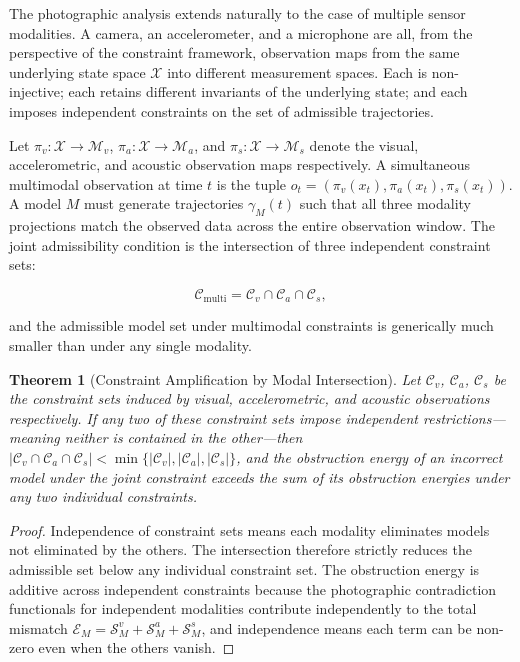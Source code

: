 \documentclass[12pt, a4paper, oneside]{article}
\theoremstyle{plain}
\newtheorem{theorem}{Theorem}[section]
\theoremstyle{definition}
\theoremstyle{remark}
\newcommand{\X}{\mathcal{X}}
\newcommand{\C}{\mathcal{C}}
\newcommand{\M}{\mathcal{M}}
\newcommand{\proj}{\pi}
\begin{document}
The photographic analysis extends naturally to the case of multiple sensor modalities. A camera, an accelerometer, and a microphone are all, from the perspective of the constraint framework, observation maps from the same underlying state space $\X$ into different measurement spaces. Each is non-injective; each retains different invariants of the underlying state; and each imposes independent constraints on the set of admissible trajectories.

Let $\proj_v : \X \to \M_v$, $\proj_a : \X \to \M_a$, and $\proj_s : \X \to \M_s$ denote the visual, accelerometric, and acoustic observation maps respectively. A simultaneous multimodal observation at time $t$ is the tuple $o_t = (\proj_v(x_t), \proj_a(x_t), \proj_s(x_t))$. A model $M$ must generate trajectories $\gamma_M(t)$ such that all three modality projections match the observed data across the entire observation window. The joint admissibility condition is the intersection of three independent constraint sets:

\begin{equation}
\C_{\mathrm{multi}} = \C_v \cap \C_a \cap \C_s,
\end{equation}

and the admissible model set under multimodal constraints is generically much smaller than under any single modality.

\begin{theorem}[Constraint Amplification by Modal Intersection]
\label{thm:modal-amplification}
Let $\C_v$, $\C_a$, $\C_s$ be the constraint sets induced by visual, accelerometric, and acoustic observations respectively. If any two of these constraint sets impose independent restrictions---meaning neither is contained in the other---then $|\C_v \cap \C_a \cap \C_s| < \min\{|\C_v|, |\C_a|, |\C_s|\}$, and the obstruction energy of an incorrect model under the joint constraint exceeds the sum of its obstruction energies under any two individual constraints.
\end{theorem}

\begin{proof}
Independence of constraint sets means each modality eliminates models not eliminated by the others. The intersection therefore strictly reduces the admissible set below any individual constraint set. The obstruction energy is additive across independent constraints because the photographic contradiction functionals for independent modalities contribute independently to the total mismatch $\mathcal{E}_M = \mathcal{S}^v_M + \mathcal{S}^a_M + \mathcal{S}^s_M$, and independence means each term can be non-zero even when the others vanish.
\end{proof}
\end{document}
